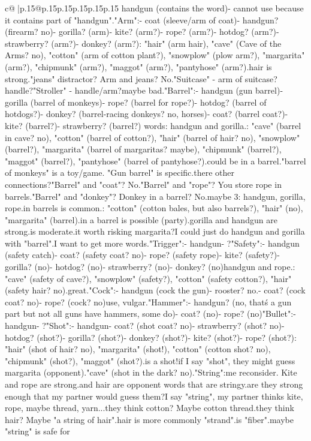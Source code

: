 \documentclass{article}
\begin{document}
{\begin{supertabular}{c@{$\;$}|p{.15\linewidth}@{}p{.15\linewidth}p{.15\linewidth}p{.15\linewidth}p{.15\linewidth}p{.15\linewidth}}
{{{handgun (contains the word)\n- cannot use because it contains part of "handgun".\n\n"Arm":\n- coat (sleeve/arm of coat)\n- handgun? (firearm? no)\n- gorilla? (arm)\n- kite? (arm?)\n- rope? (arm?)\n- hotdog? (arm?)\n- strawberry? (arm?)\n- donkey? (arm?)\nOpponent: "hair" (arm hair), "cave" (Cave of the Arms? no), "cotton" (arm of cotton plant?), "snowplow" (plow arm?), "margarita" (arm?), "chipmunk" (arm?), "maggot" (arm?), "pantyhose" (arm?).\nArm hair is strong.\nAlso "jeans" distractor? Arm and jeans? No.\n"Suitcase" - arm of suitcase? handle?\n"Stroller" - handle/arm?\nSo maybe bad.\n\n"Barrel":\n- handgun (gun barrel)\n- gorilla (barrel of monkeys)\n- rope? (barrel for rope?)\n- hotdog? (barrel of hotdogs?)\n- donkey? (barrel-racing donkeys? no, horses)\n- coat? (barrel coat?)\n- kite? (barrel?)\n- strawberry? (barrel?) words: handgun and gorilla.\nOpponent: "cave" (barrel in cave? no), "cotton" (barrel of cotton?), "hair" (barrel of hair? no), "snowplow" (barrel?), "margarita" (barrel of margaritas? maybe), "chipmunk" (barrel?), "maggot" (barrel?), "pantyhose" (barrel of pantyhose?).\nMargarita could be in a barrel.\nBut "barrel of monkeys" is a toy/game. "Gun barrel" is specific.\nAre there other connections?\n"Barrel" and "coat"? No.\n"Barrel" and "rope"? You store rope in barrels.\n"Barrel" and "donkey"? Donkey in a barrel? No.\nSo maybe 3: handgun, gorilla, rope.\nRope in barrels is common.\nOpponent: "cotton" (cotton bales, but also barrels?), "hair" (no), "margarita" (barrel).\nMargarita in a barrel is possible (party).\nBut gorilla and handgun are strong.\nRope is moderate.\nIs it worth risking margarita?\nOr I could just do handgun and gorilla with "barrel".\nBut I want to get more words.\n\n"Trigger":\n- handgun\n- ?\n\n"Safety":\n- handgun (safety catch)\n- coat? (safety coat? no)\n- rope? (safety rope)\n- kite? (safety?)\n- gorilla? (no)\n- hotdog? (no)\n- strawberry? (no)\n- donkey? (no)\nSo handgun and rope.\nOpponent: "cave" (safety of cave?), "snowplow" (safety?), "cotton" (safety cotton?), "hair" (safety hair? no).\nNot great.\n\n"Cock":\n- handgun (cock the gun)\n- rooster? no.\n- coat? (cock coat? no)\n- rope? (cock? no)\nCannot use, vulgar.\n\n"Hammer":\n- handgun? (no, that\'s a gun part but not all guns have hammers, some do)\n- coat? (no)\n- rope? (no)\n\n"Bullet":\n- handgun\n- ?\n\n"Shot":\n- handgun\n- coat? (shot coat? no)\n- strawberry? (shot? no)\n- hotdog? (shot?)\n- gorilla? (shot?)\n- donkey? (shot?)\n- kite? (shot?)\n- rope? (shot?)\nOpponent: "hair" (shot of hair? no), "margarita" (shot!), "cotton" (cotton shot? no), "chipmunk" (shot?), "maggot" (shot?).\nMargarita is a shot!\nSo if I say "shot", they might guess margarita (opponent).\nAlso "cave" (shot in the dark? no).\n\n"String":\nLet me reconsider. Kite and rope are strong.\nCotton and hair are opponent words that are stringy.\nBut are they strong enough that my partner would guess them?\nIf I say "string", my partner thinks kite, rope, maybe thread, yarn...\nWould they think cotton? Maybe cotton thread.\nWould they think hair? Maybe "a string of hair".\nBut hair is more commonly "strand".\nCotton is "fiber".\nSo maybe "string" is safe for }}}
\end{supertabular}}
\end{document}

